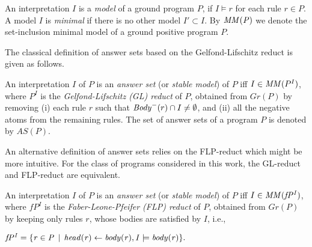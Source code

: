 An interpretation $I$ is a \emph{model} of a ground program $P$, if $I \models r$ for each rule
$r \in P$. A model $I$ is \emph{minimal} if there is no other model $I' \subset I$.
By $\mathit{MM(P)}$ we denote the set-inclusion minimal model of a ground positive program $P$.

The classical definition of answer sets based on the Gelfond-Lifschitz reduct \cite{GL1988} is given as follows.
 \begin{definition}
 An interpretation $I$ of $P$ is an \emph{answer set} (or \emph{stable model}) of $P$ iff $I \in \mathit{MM}(P^I)$, where $P^I$ is the \emph{Gelfond-Lifschitz (GL) reduct} of $P$, obtained from $Gr(P)$ by removing (i) each rule $r$ such that $\mathit{Body}^-(r) \cap I\neq\emptyset$, and (ii) all the negative atoms from the remaining rules. The set of answer sets of a program $P$ is denoted by $AS(P)$.
 \end{definition}

An alternative definition of answer sets relies on the FLP-reduct \cite{FLP2011} which might be more intuitive.
For the class of programs considered in this work, the GL-reduct and FLP-reduct are equivalent.

\begin{definition}
An interpretation $I$ of $P$ is an \emph{answer set} (or \emph{stable model}) of $P$ iff $I \in \mathit{MM(fP^I)}$, where $fP^I$ is the \emph{Faber-Leone-Pfeifer (FLP) reduct} of  $P$, obtained from $Gr(P)$ by keeping only rules $r$, whose bodies are satisfied by $I$, i.e., \begin{center}$\mathit{fP^I = \{r \in P \,\mid\, head(r)\leftarrow body(r), I \models body(r)\}}.$\end{center}
\end{definition}

